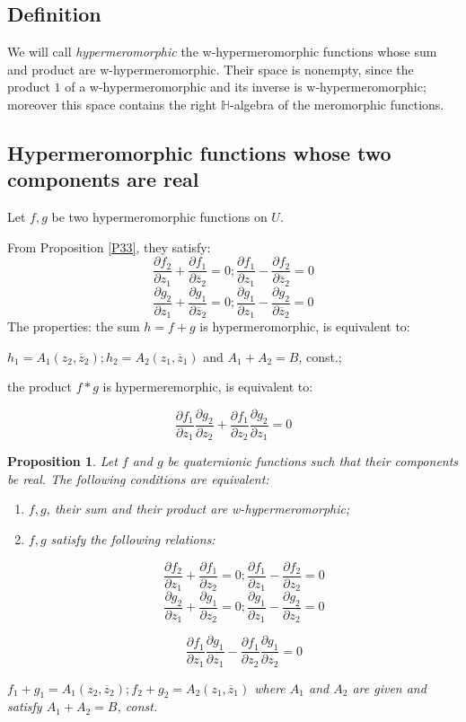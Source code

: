 \documentclass[12pt]{amsart}
\newtheorem{prop}[thm]{Proposition}
\theoremstyle{definition}
\begin{document}
\subsection{Definition} We will call {\it hypermeromorphic} the w-hypermeromorphic functions whose sum and product are w-hypermeromorphic. Their space is nonempty, since the product $1$ of a w-hypermeromorphic and its inverse is w-hypermeromorphic; moreover this space contains the right ${\mathbb H}$-algebra of the meromorphic functions. 

\subsection{Hypermeromorphic functions whose two components are real}

Let $f,g$ be two hypermeromorphic functions on $U$. 

From Proposition \ref{P33}, they satisfy: 
$$
\frac{\partial f_2}{\partial z_1}+\frac{\partial f_1}{\partial \overline z_2}=0; 
\frac{\partial f_1}{\partial z_1}-\frac{\partial f_2}{\partial\overline z_2}=0
$$
$$
\frac{\partial g_2}{\partial z_1}+\frac{\partial g_1}{\partial \overline z_2}=0; 
\frac{\partial g_1}{\partial z_1}-\frac{\partial g_2}{\partial\overline z_2}=0
$$
The properties: the sum $h=f+g$ is hypermeromorphic, is equivalent to:

$h_1=A_1(z_2,\overline z_2); h_2=A_2(z_1,\overline z_1)$ and $A_1+A_2=B$, const.;

the product $f*g$ is hypermeremorphic, is equivalent to:

$$
\frac{\partial f_1}{\partial z_1}\frac{\partial g_2}{\partial z_2}+\frac{\partial
f_1}{\partial z_2}\frac{\partial g_2}{\partial z_1}=0
$$ 

\begin{prop}Let $f$ and $g$ be quaternionic functions such that their components be real. The following conditions are equivalent:
\begin{enumerate}
\item[$(i)$] $f, g$, their sum and their product are w-hypermeromorphic;
\item[$(ii)$] $f, g$ satisfy the following relations:

$$
\frac{\partial f_2}{\partial z_1}+\frac{\partial f_1}{\partial z_2}=0; 
\frac{\partial f_1}{\partial z_1}-\frac{\partial f_2}{\partial z_2}=0
$$
$$
\frac{\partial g_2}{\partial z_1}+\frac{\partial g_1}{\partial z_2}=0; 
\frac{\partial g_1}{\partial z_1}-\frac{\partial g_2}{\partial z_2}=0
$$

$$
\frac{\partial f_1}{\partial z_1}\frac{\partial g_1}{\partial z_1}-\frac{\partial f_1}{\partial z_2}\frac{\partial g_1}{\partial z_2}=0 
$$
\end{enumerate}
$f_1+g_1=A_1(z_2,\overline z_2); f_2+g_2=A_2(z_1,\overline z_1)$ where $A_1$ and $A_2$ are given and satisfy $A_1+A_2=B$, const.
\end{prop}
\end{document}
